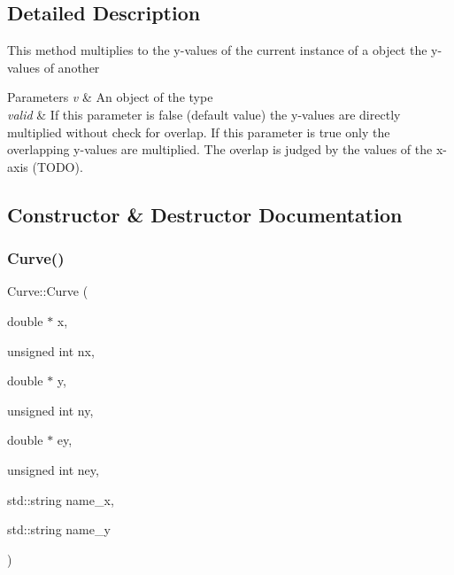 \subsection{Detailed Description}
This method multiplies to the y-\/values of the current instance of a object the y-\/values of another


\begin{DoxyParams}{Parameters}
{\em v} & An object of the type\\
\hline
{\em valid} & If this parameter is false (default value) the y-\/values are directly multiplied without check for overlap. If this parameter is true only the overlapping y-\/values are multiplied. The overlap is judged by the values of the x-\/axis (T\+O\+DO). \\
\hline
\end{DoxyParams}


\subsection{Constructor \& Destructor Documentation}
\mbox{\label{class_curve_a627534496c4472dedcb5c8bd67f579d0}} 
\subsubsection{\texorpdfstring{Curve()}{Curve()}\hspace{0.1cm}{\footnotesize\ttfamily [1/6]}}
{\footnotesize\ttfamily Curve\+::\+Curve (\begin{DoxyParamCaption}\item[{double $\ast$}]{x,  }\item[{unsigned int}]{nx,  }\item[{double $\ast$}]{y,  }\item[{unsigned int}]{ny,  }\item[{double $\ast$}]{ey,  }\item[{unsigned int}]{ney,  }\item[{std\+::string}]{name\+\_\+x,  }\item[{std\+::string}]{name\+\_\+y }\end{DoxyParamCaption})}

\mbox{\label{class_curve_a25dc8db43ed446103e71652dd37f4822}} 
